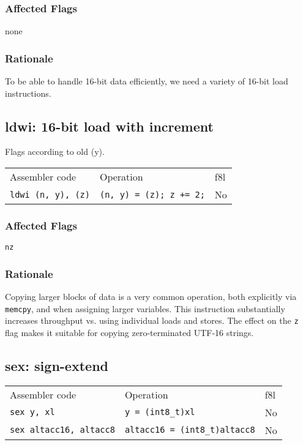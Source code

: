 \documentclass{book}
\begin{document}
\subsubsection*{Affected Flags}

none

\subsubsection*{Rationale}

To be able to handle 16-bit data efficiently, we need a variety of 16-bit load instructions.


\subsection{ldwi: 16-bit load with increment}

Flags according to old (y).

\begin{tabular}{l l l}
Assembler code         & Operation                         & f8l \\
\texttt{ldwi (n, y), (z)} & \texttt{(n, y) = (z); z += 2;} & No \\
\end{tabular}

\subsubsection*{Affected Flags}

\texttt{nz}

\subsubsection*{Rationale}

Copying larger blocks of data is a very common operation, both explicitly via \texttt{memcpy}, and when assigning larger variables. This instruction substantially increases throughput vs. using individual loads and stores. The effect on the \texttt{z} flag makes it suitable for copying zero-terminated UTF-16 strings.


\subsection{sex: sign-extend}

\begin{tabular}{l l l}
Assembler code                 & Operation                            & f8l \\
\texttt{sex y, xl}             & \texttt{y = (int8\_t)xl}             & No \\
\texttt{sex altacc16, altacc8} & \texttt{altacc16 = (int8\_t)altacc8} & No \\
\end{tabular}
\end{document}
